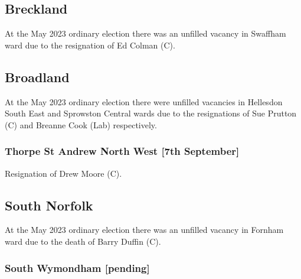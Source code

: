 \documentclass[a4paper,openany]{book}
\begin{document}
\begin{resultsiii}
\subsection*{Breckland}

At the May 2023 ordinary election there was an unfilled vacancy in Swaffham ward due to the resignation of Ed Colman (C).%

\subsection*{Broadland}

At the May 2023 ordinary election there were unfilled vacancies in Hellesdon South East and Sprowston Central wards due to the resignations of Sue Prutton (C) and Breanne Cook (Lab) respectively.%
%

\subsubsection*{Thorpe St Andrew North West \hspace*{\fill}\nolinebreak[1]%
	\enspace\hspace*{\fill}
	[7th September]}


Resignation of Drew Moore (C).

\subsection*{South Norfolk}

At the May 2023 ordinary election there was an unfilled vacancy in Fornham ward due to the death of Barry Duffin (C).%

\subsubsection*{South Wymondham \hspace*{\fill}\nolinebreak[1]%
	\enspace\hspace*{\fill}
	[pending]}



\end{resultsiii}
\end{document}

